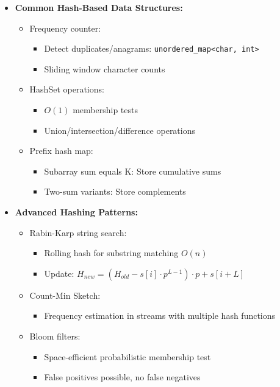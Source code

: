 \documentclass[a4paper,10pt]{book}
\begin{document}
\begin{itemize}
    \item \textbf{Common Hash-Based Data Structures:}
    \begin{itemize}
        \item Frequency counter: 
        \begin{itemize}
            \item Detect duplicates/anagrams: \texttt{unordered\_map<char, int>}
            \item Sliding window character counts
        \end{itemize}
        \item HashSet operations:
        \begin{itemize}
            \item $O(1)$ membership tests
            \item Union/intersection/difference operations
        \end{itemize}
        \item Prefix hash map:
        \begin{itemize}
            \item Subarray sum equals K: Store cumulative sums
            \item Two-sum variants: Store complements
        \end{itemize}
    \end{itemize}
    
    \item \textbf{Advanced Hashing Patterns:}
    \begin{itemize}
        \item Rabin-Karp string search:
        \begin{itemize}
            \item Rolling hash for substring matching $O(n)$
            \item Update: $H_{new} = (H_{old} - s[i] \cdot p^{L-1}) \cdot p + s[i+L]$
        \end{itemize}
        \item Count-Min Sketch:
        \begin{itemize}
            \item Frequency estimation in streams with multiple hash functions
        \end{itemize}
        \item Bloom filters:
        \begin{itemize}
            \item Space-efficient probabilistic membership test
            \item False positives possible, no false negatives
        \end{itemize}
    \end{itemize}
    

\end{itemize}
\end{document}
